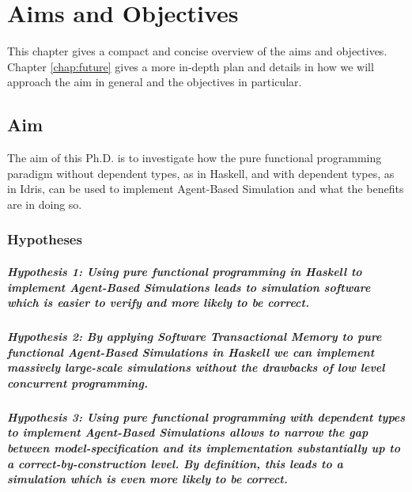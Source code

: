 \chapter{Aims and Objectives}
\label{chap:aimsObj}

This chapter gives a compact and concise overview of the aims and objectives. Chapter \ref{chap:future} gives a more in-depth plan and details in how we will approach the aim in general and the objectives in particular.

\section{Aim}
The aim of this Ph.D. is to investigate how the pure functional programming paradigm without dependent types, as in Haskell, and with dependent types, as in Idris, can be used to implement Agent-Based Simulation and what the benefits are in doing so.

\subsection{Hypotheses}
\paragraph{Hypothesis 1: Using pure functional programming in Haskell to implement Agent-Based Simulations leads to simulation software which is easier to verify and more likely to be correct.}

\paragraph{Hypothesis 2: By applying Software Transactional Memory to pure functional Agent-Based Simulations in Haskell we can implement massively large-scale simulations without the drawbacks of low level concurrent programming.}

\paragraph{Hypothesis 3: Using pure functional programming with dependent types to implement Agent-Based Simulations allows to narrow the gap between model-specification and its implementation substantially up to a correct-by-construction level. By definition, this leads to a simulation which is even more likely to be correct.}

